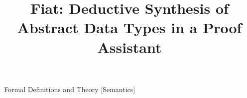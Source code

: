 \documentclass[preprint]{sigplanconf}
\begin{document}
\title{Fiat: Deductive Synthesis of Abstract Data Types in a Proof Assistant}

\authorinfo{}

\maketitle

\begin{abstract}



\end{abstract}

               {Formal Definitions and Theory}
               [Semantics]

\keywords















\cleardoublepage

\appendix
%
\end{document}
